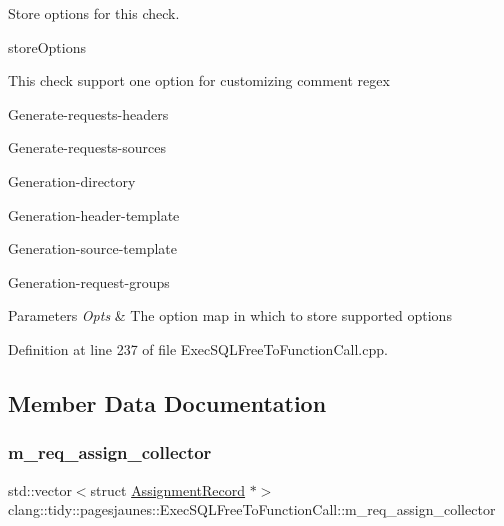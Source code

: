 Store options for this check. 

store\+Options

This check support one option for customizing comment regex
\begin{DoxyItemize}
\item Generate-\/requests-\/headers
\item Generate-\/requests-\/sources
\item Generation-\/directory
\item Generation-\/header-\/template
\item Generation-\/source-\/template
\item Generation-\/request-\/groups
\end{DoxyItemize}


\begin{DoxyParams}{Parameters}
{\em Opts} & The option map in which to store supported options \\
\hline
\end{DoxyParams}


Definition at line 237 of file Exec\+S\+Q\+L\+Free\+To\+Function\+Call.\+cpp.



\subsection{Member Data Documentation}
\mbox{\label{classclang_1_1tidy_1_1pagesjaunes_1_1_exec_s_q_l_free_to_function_call_abb7a7aa7ae598abf4f6d2e6ccd139dda}} 
\subsubsection{\texorpdfstring{m\+\_\+req\+\_\+assign\+\_\+collector}{m\_req\_assign\_collector}}
{\footnotesize\ttfamily std\+::vector$<$struct \hyperlink{structclang_1_1tidy_1_1pagesjaunes_1_1_exec_s_q_l_free_to_function_call_1_1_assignment_record}{Assignment\+Record} $\ast$$>$ clang\+::tidy\+::pagesjaunes\+::\+Exec\+S\+Q\+L\+Free\+To\+Function\+Call\+::m\+\_\+req\+\_\+assign\+\_\+collector\hspace{0.3cm}{\ttfamily [protected]}}



